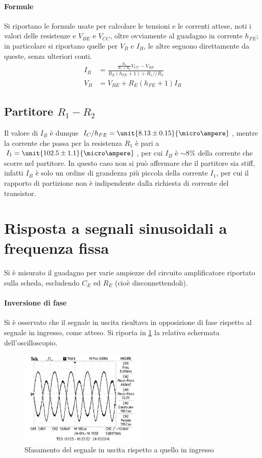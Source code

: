 \documentclass[10pt,a4paper]{article}
\begin{document}
\paragraph{Formule} Si riportano le formule usate per calcolare le tensioni e le correnti attese, noti i valori delle resistenze e $V_{BE}$ e $V_{CC}$, oltre ovviamente al guadagno in corrente $h_{FE}$; in particolare si riportano quelle per $V_B$ e $I_B$, le altre seguono direttamente da queste, senza ulteriori conti.
\begin{align*}
I_B &= \frac{\frac{R_2}{R_1 + R_2} V_{CC} - V_{BE}}{R_E (h_{FE} + 1) + R_1 // R_2} \\
V_B &= V_{BE} + R_E (h_{FE} + 1) I_B
\end{align*}

\subsection{Partitore $R_1-R_2$}
Il valore di $I_B$ è dunque $I_C/h_{FE} = \unit{8.13 \pm 0.15}{\micro\ampere}$, mentre la corrente che passa per la resistenza $R_1$ è pari a $I_1 = \unit{102.5 \pm 1.1}{\micro\ampere}$, per cui $I_B$ è $\sim 8\%$ della corrente che scorre nel partitore. In questo caso non si può affermare che il partitore sia stiff, infatti $I_B$ è solo un ordine di grandezza più piccola della corrente $I_1$, per cui il rapporto di partizione non è indipendente dalla richiesta di corrente del transistor.

\section{Risposta a segnali sinusoidali a frequenza fissa}
Si è misurato il guadagno per varie ampiezze del circuito amplificatore riportato sulla scheda, escludendo $C_E$ ed $R_E$ (cioè disconnettendoli).

\paragraph{Inversione di fase} Si è osservato che il segnale in uscita risultava in opposizione di fase rispetto al segnale in ingresso, come atteso. Si riporta in \figurename{\ref{fig:sfasamento}} la relativa schermata dell'oscilloscopio.

\begin{figure}[h!]
	\centering
	\includegraphics[width=0.54\textwidth]{../oscilloscopio/sfasamento.jpg}
	\caption{Sfasamento del segnale in uscita rispetto a quello in ingresso}
	\label{fig:sfasamento}
\end{figure}
\end{document}
